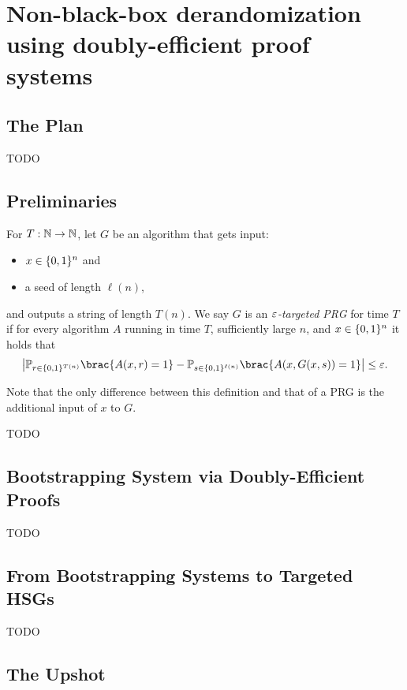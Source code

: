 \chapter{Non-black-box derandomization using doubly-efficient proof systems}\label{lec:10}

\section{The Plan}
TODO

\section{Preliminaries}

\begin{definition}%
  \label{defn:targeted-PRG}
  For $T : \mathbb{N} \to \mathbb{N}$, let $G$ be an algorithm that gets input:
  \begin{itemize}
    \item $x \in \{0, 1\}^n$ and
    \item a seed of length $\ell(n)$,
  \end{itemize}
  and outputs a string of length $T(n)$.
  We say $G$ is an \emph{$\varepsilon$-targeted PRG} for time $T$ if for every algorithm
  $A$ running in time $T$, sufficiently large $n$, and $x \in \{0, 1\}^n$ it holds
  that
  \[
    \card*{ \Pr_{r \in \set{0, 1}^{T(n)}} \brac{ A(x, r) = 1 } -
    \Pr_{s \in \set{0, 1}^{\ell(n)}} \brac{ A(x, G(x, s)) = 1 }} \leq \eps.
  \]
\end{definition}
Note that the only difference between this definition and that of a PRG is
the additional input of $x$ to $G$.

TODO

\section{Bootstrapping System via Doubly-Efficient Proofs}
TODO

\section{From Bootstrapping Systems to Targeted HSGs}
TODO

\section*{The Upshot}

